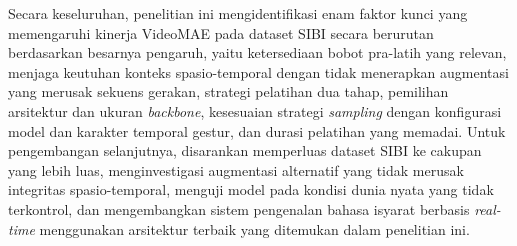 \begin{center}
	Secara keseluruhan, penelitian ini mengidentifikasi enam faktor kunci yang memengaruhi kinerja VideoMAE pada dataset SIBI secara berurutan berdasarkan besarnya pengaruh, yaitu ketersediaan bobot pra-latih yang relevan, menjaga keutuhan konteks spasio-temporal dengan tidak menerapkan augmentasi yang merusak sekuens gerakan, strategi pelatihan dua tahap, pemilihan arsitektur dan ukuran \textit{backbone}, kesesuaian strategi \textit{sampling} dengan konfigurasi model dan karakter temporal gestur, dan durasi pelatihan yang memadai. Untuk pengembangan selanjutnya, disarankan memperluas dataset SIBI ke cakupan yang lebih luas, menginvestigasi augmentasi alternatif yang tidak merusak integritas spasio-temporal, menguji model pada kondisi dunia nyata yang tidak terkontrol, dan mengembangkan sistem pengenalan bahasa isyarat berbasis \textit{real-time} menggunakan arsitektur terbaik yang ditemukan dalam penelitian ini.

	\vfill

\end{center}
\clearpage
